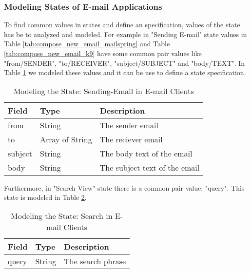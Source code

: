 \subsubsection{Modeling States of E-mail Applications}
To find common values in states and define an specification, values of the state has be to analyzed and modeled. For example in "Sending E-mail" state values in Table \ref{tab:compose_new_email_mailspring} and Table \ref{tab:compose_new_email_k9} have some common pair values like "from/SENDER", "to/RECEIVER", "subject/SUBJECT" and "body/TEXT". In Table \ref{tab:email-model} we modeled these values and it can be use to define a state specification. 


\FloatBarrier\FloatBarrier \begin{table}[H]
\centering
\begin{tabular}{lll}
Field   & Type   & Description                    \\ 
\hline
from    & String & The sender email               \\
to      & Array of String  & The reciever email             \\
subject & String & The body text of the email     \\
body    & String & The subject text of the email 
\end{tabular}
\caption{Modeling the State: Sending-Email in E-mail Clients}
\label{tab:email-model}
\end{table} \FloatBarrier


Furthermore, in "Search View" state there is a common pair value: "query". This state is modeled in Table \ref{tab:search-model}.


\FloatBarrier
\begin{table}[H]
\centering
\begin{tabular}{lll}
Field & Type   & Description        \\ 
\hline
query & String & The search phrase 
\end{tabular}
\caption{Modeling the State: Search in E-mail Clients}
\label{tab:search-model}
\end{table}
\FloatBarrier



